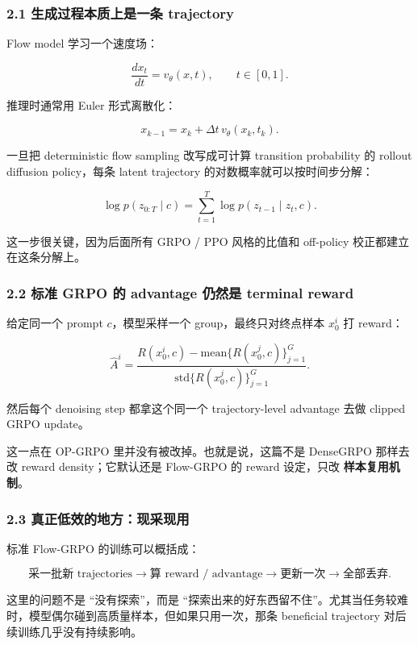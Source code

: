\subsubsection{2.1 生成过程本质上是一条 trajectory}

Flow model 学习一个速度场：

\[
\frac{d x_t}{dt} = v_{\theta}(x,t), \qquad t \in [0,1].
\]

推理时通常用 Euler 形式离散化：

\[
x_{k-1} = x_k + \Delta t \, v_{\theta}(x_k, t_k).
\]

一旦把 deterministic flow sampling 改写成可计算 transition probability 的 rollout diffusion policy，每条 latent trajectory 的对数概率就可以按时间步分解：

\[
\log p(z_{0:T} \mid c)
=
\sum_{t=1}^{T}
\log p(z_{t-1} \mid z_t, c).
\]

这一步很关键，因为后面所有 GRPO / PPO 风格的比值和 off-policy 校正都建立在这条分解上。

\subsubsection{2.2 标准 GRPO 的 advantage 仍然是 terminal reward}

给定同一个 prompt \(c\)，模型采样一个 group，最终只对终点样本 \(x_0^i\) 打 reward：

\[
\hat{A}^i
=
\frac{
R(x_0^i,c)-\mathrm{mean}\{R(x_0^j,c)\}_{j=1}^{G}
}{
\mathrm{std}\{R(x_0^j,c)\}_{j=1}^{G}
}.
\]

然后每个 denoising step 都拿这个同一个 trajectory-level advantage 去做 clipped GRPO update。

这一点在 OP-GRPO 里并没有被改掉。也就是说，这篇不是 DenseGRPO 那样去改 reward density；它默认还是 Flow-GRPO 的 reward 设定，只改 \textbf{样本复用机制}。

\subsubsection{2.3 真正低效的地方：现采现用}

标准 Flow-GRPO 的训练可以概括成：

\[
\text{采一批新 trajectories}
\rightarrow
\text{算 reward / advantage}
\rightarrow
\text{更新一次}
\rightarrow
\text{全部丢弃}.
\]

这里的问题不是 ``没有探索''，而是 ``探索出来的好东西留不住''。尤其当任务较难时，模型偶尔碰到高质量样本，但如果只用一次，那条 beneficial trajectory 对后续训练几乎没有持续影响。

